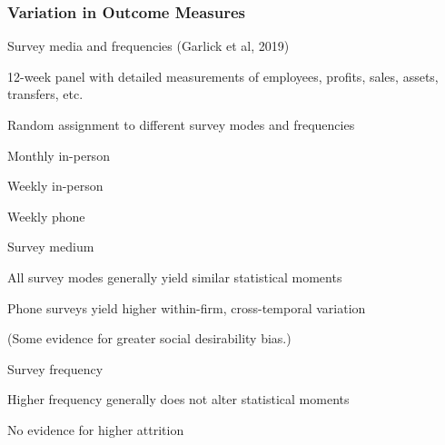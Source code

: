\documentclass[hideothersubsections, usenames,dvipsnames,11pt]{beamer}
\newenvironment{itemize_2pt}{\itemize\addtolength{\itemsep}{2pt}}{\enditemize}
\newenvironment{enumerate_2pt}{\enumerate\addtolength{\itemsep}{2pt}}{\endenumerate}
\begin{document}
\begin{frame}
\frametitle{Variation in Outcome Measures}

Survey media and frequencies {(Garlick et al, 2019)}
\begin{itemize_2pt}
	\item 12-week panel with detailed measurements of employees, profits, sales, assets, transfers, etc.

	\item Random assignment to different survey modes and frequencies
	\begin{enumerate_2pt}
		\item Monthly in-person
		\item Weekly in-person
		\item Weekly phone
	\end{enumerate_2pt}
		
	\pause		
	
	\item Survey medium
	\begin{itemize_2pt}
		\item \textcolor{bdf}{All survey modes generally yield similar statistical moments}
		\item Phone surveys yield higher within-firm, cross-temporal variation
		\item[] (Some evidence for greater social desirability bias.)
	\end{itemize_2pt}
	
	\item Survey frequency
	\begin{itemize_2pt}
		\item \textcolor{bdf}{Higher frequency generally does not alter statistical moments}
		\item No evidence for higher attrition
	\end{itemize_2pt}
\end{itemize_2pt}
\end{frame}



\end{document}
